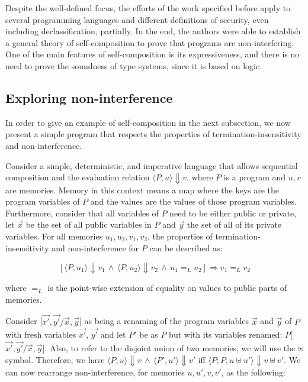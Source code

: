 Despite the well-defined focus, the efforts of the work specified before apply to several programming languages and different definitions of security, even including declassification, partially.
In the end, the authors were able to establish a general theory of self-composition to prove that programs are non-interfering.
One of the main features of self-composition is its expressiveness, and there is no need to prove the soundness of type systems, since it is based on logic.


\subsection{Exploring non-interference}
\label{subsec:exploring_non_interference}

In order to give an example of self-composition in the next subsection, we now present a simple program that respects the properties of termination-insensitivity and non-interference.

Consider a simple, deterministic, and imperative language that allows sequential composition and the evaluation relation \(\langle P, u\rangle \Downarrow v\), where \(P\) is a program and \(u,v\) are memories.
Memory in this context means a map where the keys are the program variables of \(P\) and the values are the values of those program variables.
Furthermore, consider that all variables of \(P\) need to be either public or private, let \(\overrightarrow{x}\) be the set of all public variables in \(P\) and \(\overrightarrow{y}\) the set of all of its private variables.
For all memories \(u_1,u_2,v_1,v_2\), the properties of termination-insensitivity and non-interference for \(P\) can be described as:

\[ [\langle P, u_1\rangle \Downarrow v_1 \, \land \, \langle P, u_2\rangle \Downarrow v_2 \, \land \, u_1 {=}_{L} u_2] \Rightarrow v_1 {=}_{L} v_2 \]

where ${=}_{L}$ is the point-wise extension of equality on values to public parts of memories.

Consider [\(\overrightarrow{x'}, \overrightarrow{y'} / \overrightarrow{x}, \overrightarrow{y}\)] as being a renaming of the program variables \(\overrightarrow{x}\) and \(\overrightarrow{y}\) of \(P\) with fresh variables \(\overrightarrow{x'}\), \(\overrightarrow{y'}\) and let \(P'\) be as \(P\) but with its variables renamed: \(P\)[\(\overrightarrow{x'}, \overrightarrow{y'} / \overrightarrow{x}, \overrightarrow{y}\)].
Also, to refer to the disjoint union of two memories, we will use the $\uplus$ symbol.
Therefore, we have \(\langle P, u\rangle \Downarrow v \, \land \, \langle P', u'\rangle \Downarrow v' \) iff \(\langle P; P, u \uplus u' \rangle \Downarrow v \uplus v'\).
We can now rearrange non-interference, for memories \(u,u',v,v'\), as the following:

